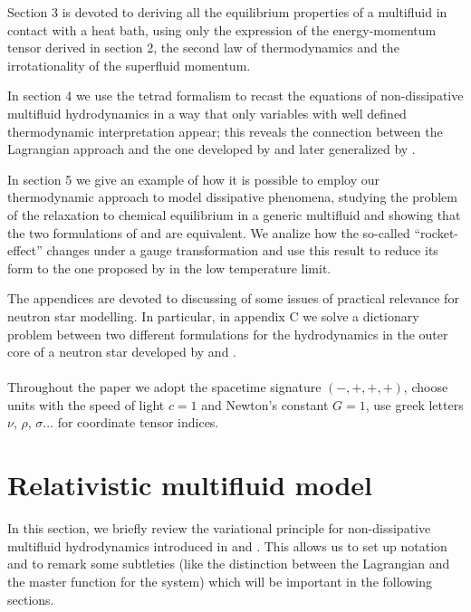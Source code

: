 \documentclass[usenatbib]{mnras}
\begin{document}
Section 3 is devoted to deriving all the equilibrium properties of a multifluid in contact with a heat bath, using only the expression of the energy-momentum tensor derived in section 2, the second law of thermodynamics and the irrotationality of the superfluid momentum.

In section 4 we use  the tetrad formalism to recast the equations of non-dissipative multifluid hydrodynamics in a way that only variables with well defined thermodynamic interpretation appear; this reveals the connection between the Lagrangian approach and the one developed by \cite{Son2001} and later generalized by  \cite{GusakovAndersson2006}.

In section 5 we give an example of how it is possible to employ our thermodynamic approach to model dissipative phenomena, studying the problem of the relaxation to chemical equilibrium in a generic multifluid and showing that the two formulations of \cite{langlois98} and \cite{Gusakov2007} are equivalent. 
We analize how the so-called ``rocket-effect''  changes under a gauge transformation and use this result to reduce its form to the one proposed by  \cite{ColucciRocket2013} in the low temperature limit.

The appendices are devoted to discussing of some issues of practical relevance for neutron star modelling. In particular, in appendix C we solve a dictionary problem between two different formulations for the hydrodynamics in the outer core of a neutron star developed by \cite{pca2002} and \cite{KP2017}.
\\
\\
Throughout the paper we adopt the spacetime signature $ ( - , +, + , + ) $, choose units with the speed of light $c=1$ and Newton's constant $G=1$, use greek letters $\nu$, $\rho$, $\sigma$... for coordinate tensor indices.


\section{Relativistic multifluid  model}
\label{sec:Gftva}

In this section, we briefly review the variational principle for non-dissipative multifluid hydrodynamics introduced in \cite{Comer_1993} and \cite{comer_langlois1994}. This allows us to set up notation and to remark some subtleties (like the distinction between the Lagrangian and the master function for the system) which will be important in the following sections. 
\end{document}
